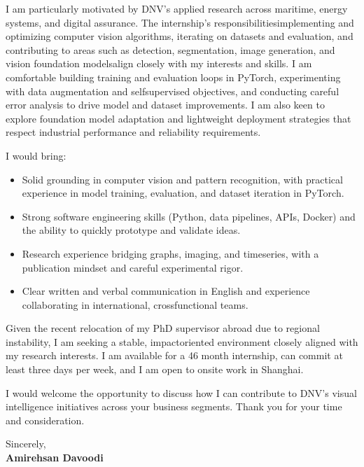 \documentclass[11pt]{article}
\begin{document}
I am particularly motivated by DNV’s applied research across maritime, energy systems, and digital assurance. The internship’s responsibilities\textemdash{}implementing and optimizing computer vision algorithms, iterating on datasets and evaluation, and contributing to areas such as detection, segmentation, image generation, and vision foundation models\textemdash{}align closely with my interests and skills. I am comfortable building training and evaluation loops in PyTorch, experimenting with data augmentation and self\textendash{}supervised objectives, and conducting careful error analysis to drive model and dataset improvements. I am also keen to explore foundation model adaptation and lightweight deployment strategies that respect industrial performance and reliability requirements.

I would bring:
\begin{itemize}
    \item Solid grounding in computer vision and pattern recognition, with practical experience in model training, evaluation, and dataset iteration in PyTorch.
    \item Strong software engineering skills (Python, data pipelines, APIs, Docker) and the ability to quickly prototype and validate ideas.
    \item Research experience bridging graphs, imaging, and time\textendash{}series, with a publication mindset and careful experimental rigor.
    \item Clear written and verbal communication in English and experience collaborating in international, cross\textendash{}functional teams.
\end{itemize}

Given the recent relocation of my PhD supervisor abroad due to regional instability, I am seeking a stable, impact\textendash{}oriented environment closely aligned with my research interests. I am available for a 4\textendash{}6 month internship, can commit at least three days per week, and I am open to on\textendash{}site work in Shanghai.

I would welcome the opportunity to discuss how I can contribute to DNV’s visual intelligence initiatives across your business segments. Thank you for your time and consideration.

Sincerely,\\[6pt]
\textbf{Amirehsan Davoodi}
\end{document}
